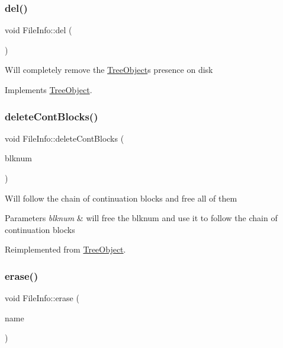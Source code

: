 \subsubsection{\texorpdfstring{del()}{del()}}
{\footnotesize\ttfamily void File\+Info\+::del (\begin{DoxyParamCaption}{ }\end{DoxyParamCaption})\hspace{0.3cm}{\ttfamily [virtual]}}

Will completely remove the \mbox{\hyperlink{classTreeObject}{Tree\+Object}}\textquotesingle{}s presence on disk 

Implements \mbox{\hyperlink{classTreeObject_af390b7479aa972888e594c07a85740b6}{Tree\+Object}}.

\mbox{\label{classFileInfo_a530a418e213a0a945b75ee1dcb8f6acb}} 
\subsubsection{\texorpdfstring{delete\+Cont\+Blocks()}{deleteContBlocks()}}
{\footnotesize\ttfamily void File\+Info\+::delete\+Cont\+Blocks (\begin{DoxyParamCaption}\item[{Blk\+Num\+Type}]{blknum }\end{DoxyParamCaption})\hspace{0.3cm}{\ttfamily [virtual]}}

Will follow the chain of continuation blocks and free all of them 
\begin{DoxyParams}{Parameters}
{\em blknum} & will free the blknum and use it to follow the chain of continuation blocks \\
\hline
\end{DoxyParams}


Reimplemented from \mbox{\hyperlink{classTreeObject_a74c73604c877bec03f6188147af7c509}{Tree\+Object}}.

\mbox{\label{classFileInfo_ae058242283d3317eaf2b79428e6137f6}} 
\subsubsection{\texorpdfstring{erase()}{erase()}}
{\footnotesize\ttfamily void File\+Info\+::erase (\begin{DoxyParamCaption}\item[{string}]{name }\end{DoxyParamCaption})\hspace{0.3cm}{\ttfamily [virtual]}}

